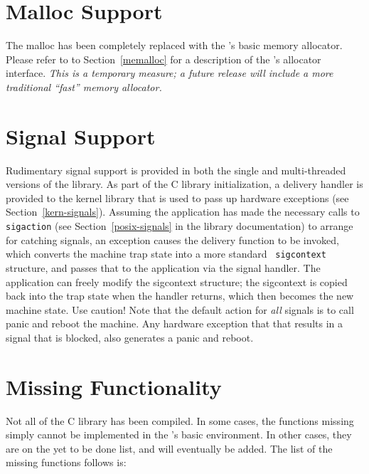 \section{Malloc Support}

The \freebsd{} malloc has been completely replaced with the \oskit's basic
memory allocator. Please refer to to Section~\ref{memalloc} for a
description of the \oskit's allocator interface. \emph{This is a temporary
measure; a future release will include a more traditional ``fast'' memory
allocator.}

\section{Signal Support}
\label{freebsd-signals}

Rudimentary signal support is provided in both the single and
multi-threaded versions of the library. As part of the C library
initialization, a delivery handler is provided to the kernel library that
is used to pass up hardware exceptions (see Section~\ref{kern-signals}).
Assuming the application has made the necessary calls to {\tt sigaction}
(see Section~\ref{posix-signals} in the \posix{} library documentation) to
arrange for catching signals, an exception causes the delivery function to
be invoked, which converts the machine trap state into a more standard {\tt
sigcontext} structure, and passes that to the application via the signal
handler. The application can freely modify the sigcontext structure; the
sigcontext is copied back into the trap state when the handler returns,
which then becomes the new machine state. Use caution! Note that the
default action for \emph{all} signals is to call panic and reboot the
machine. Any hardware exception that that results in a signal that is
blocked, also generates a panic and reboot.

\section{Missing Functionality}

Not all of the \freebsd{} C library has been compiled. In some cases, the
functions missing simply cannot be implemented in the \oskit's basic
environment. In other cases, they are on the yet to be done list, and will
eventually be added. The list of the missing functions follows is:


